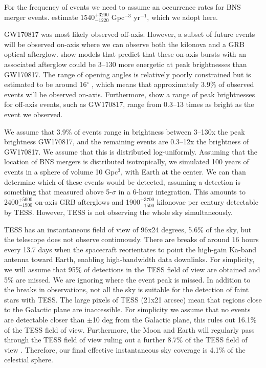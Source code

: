 \documentclass[modern]{aastex61}
\newcommand{\red}[1]{\textcolor{red}{#1}}
\begin{document}
For the frequency of events we need to assume an occurrence rates for BNS merger events. \citet{Abbott2017a} estimate $1540^{+3200}_{-1220}$ Gpc$^{-3}$ yr$^{-1}$, which we adopt here. 

GW170817 was most likely observed off-axis. However, a subset of future events will be observed on-axis where we can observe both the kilonova and a GRB optical afterglow. \citet{Metzger2012} show models that predict that these on-axis bursts with an associated afterglow could be 3--130 more energetic at peak brightnesses than GW170817. The range of opening angles is relatively poorly constrained but is estimated to be around 16$^\circ$ \citep{Fong2015}, which means that approximately 3.9\% of observed events will be observed on-axis. 
Furthermore, \citet{Metzger2012} show a range of peak brightnesses for off-axis events, such as GW170817, range from 0.3--13 times as bright as the event we observed. 

We assume that 3.9\% of events range in brightness between 3--130x the peak brightness GW170817, and the remaining events are 0.3--12x the brightness of GW170817. We assume that this is distributed log-uniformly. Assuming that the location of BNS mergers is distributed isotropically, we simulated 100 years of events in a sphere of volume 10 Gpc$^3$, with Earth at the center. We can than determine which of these events would be detected, assuming a detection is something that measured above 5-$\sigma$ in a 6-hour integration. This amounts to 2400$^{+5000}_{-1900}$ on-axis GRB afterglows and 1900$^{+3700}_{-1500}$ kilonovae per century detectable by TESS. However, TESS is not observing the whole sky simultaneously.




TESS has an instantaneous field of view of 96x24 degrees, 5.6\% of the sky, but the telescope does not observe continuously. There are breaks of around 16 hours every 13.7 days when the spacecraft reorientates to point the high-gain Ka-band antenna toward Earth, enabling high-bandwidth data downlinks. For simplicity, we will assume that 95\% of detections in the TESS field of view are obtained and 5\% are missed. We are ignoring where the event peak is missed. In addition to the breaks in observations, not all the sky is suitable for the detection of faint stars with TESS. The large pixels of TESS (21x21 arcsec) mean that regions close to the Galactic plane are inaccessible. For simplicity we assume that no events are detectable closer than $\pm$10 deg from the Galactic plane, this rules out 16.1\% of the TESS field of view. Furthermore, the Moon and Earth will regularly pass through the TESS field of view ruling out a further 8.7\% of the TESS field of view \citep{Bouma2017}. Therefore, our final effective instantaneous sky coverage is 4.1\% of the celestial sphere.
\end{document}
